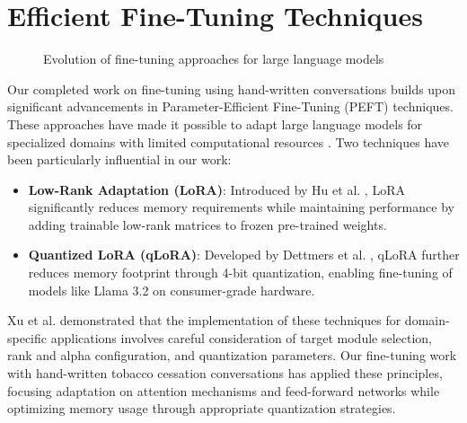 \section{Efficient Fine-Tuning Techniques}

\begin{figure}[h]
\centering
{}
\caption{Evolution of fine-tuning approaches for large language models}
\label{fig:finetuning-approaches}
\end{figure}

Our completed work on fine-tuning using hand-written conversations builds upon significant advancements in Parameter-Efficient Fine-Tuning (PEFT) techniques. These approaches have made it possible to adapt large language models for specialized domains with limited computational resources \cite{PEFT}. Two techniques have been particularly influential in our work:

\begin{itemize}[label=$\bullet$, leftmargin=1cm, itemsep=0.2cm]
\item \textbf{Low-Rank Adaptation (LoRA)}: Introduced by Hu et al. \cite{hu2022lora}, LoRA significantly reduces memory requirements while maintaining performance by adding trainable low-rank matrices to frozen pre-trained weights.

\item \textbf{Quantized LoRA (qLoRA)}: Developed by Dettmers et al. \cite{QLoRA2023}, qLoRA further reduces memory footprint through 4-bit quantization, enabling fine-tuning of models like Llama 3.2 on consumer-grade hardware.
\end{itemize}

Xu et al. \cite{LLMFineTuning} demonstrated that the implementation of these techniques for domain-specific applications involves careful consideration of target module selection, rank and alpha configuration, and quantization parameters. Our fine-tuning work with hand-written tobacco cessation conversations has applied these principles, focusing adaptation on attention mechanisms and feed-forward networks while optimizing memory usage through appropriate quantization strategies.

